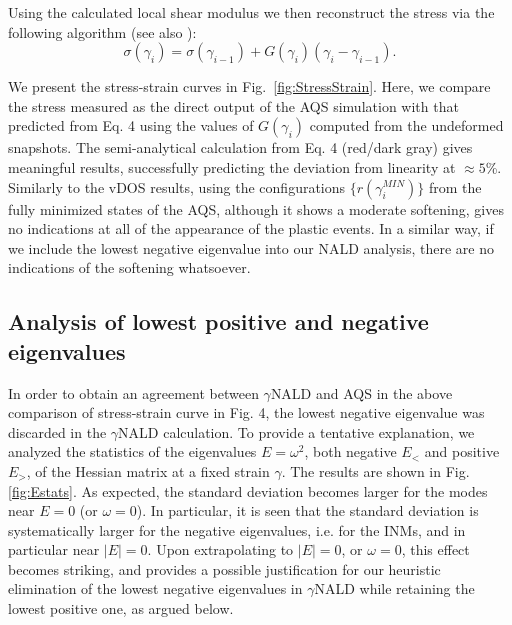 \documentclass[pre,twocolumn,aps,superscriptaddress,showpacs]{revtex4-1}
\begin{document}
Using the calculated local shear modulus we then reconstruct the stress via the following algorithm (see also \cite{Rodney2016}):
\begin{equation}
\sigma(\gamma_i)=\sigma(\gamma_{i-1})+ G(\gamma_i)(\gamma_i-\gamma_{i-1}).
\end{equation}

We present the stress-strain curves in Fig.~\ref{fig:StressStrain}. Here, we compare the stress measured as the direct output of the AQS simulation with that predicted from Eq. 4 using the values of $G(\gamma_i)$ computed from the undeformed snapshots. The semi-analytical calculation from Eq. 4 (red/dark gray) gives meaningful results, successfully predicting the deviation from linearity at $\approx 5$\%. Similarly to the vDOS results, using the configurations $\{r(\gamma^{MIN}_i)\}$ from the fully minimized states of the AQS, although it shows a moderate softening, gives no indications at all of the appearance of the plastic events. In a similar way, if we include the lowest negative eigenvalue into our NALD analysis, there are no indications of the softening whatsoever.  \\



\subsection{Analysis of lowest positive and negative eigenvalues}
In order to obtain an agreement between $\gamma$NALD and AQS in the above comparison of stress-strain curve in Fig. 4, the lowest negative eigenvalue was discarded in the $\gamma$NALD calculation. To provide a tentative explanation, we analyzed the statistics of the eigenvalues $E=\omega^2$, both negative $E_{<}$ and positive $E_{>}$, of the Hessian matrix at a fixed strain $\gamma$. The results are shown in Fig. \ref{fig:Estats}. As expected, the standard deviation becomes larger for the modes near $E=0$ (or $\omega=0$). In particular, it is seen that the standard deviation is systematically larger for the negative eigenvalues, i.e. for the INMs, and in particular near $|E|=0$. Upon extrapolating to $|E|=0$, or $\omega=0$, this effect becomes striking, and provides a possible justification for our heuristic elimination of the lowest negative eigenvalues in $\gamma$NALD while retaining the lowest positive one, as argued below.
\end{document}
